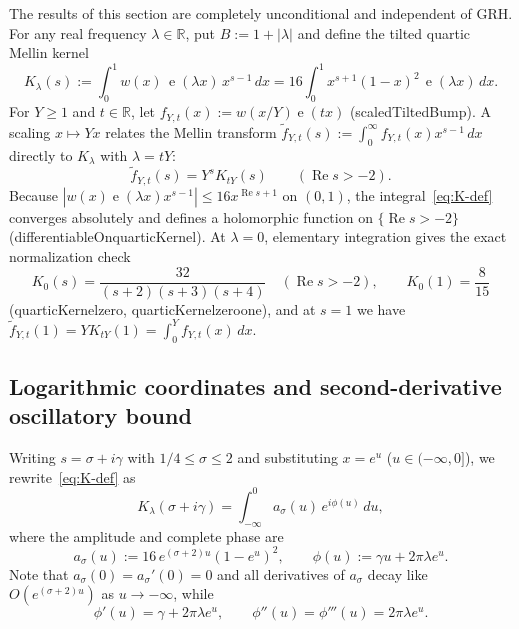 \documentclass[11pt,reqno]{amsart}
\numberwithin{equation}{section}
\theoremstyle{definition}
\newcommand{\R}{\mathbb{R}}
\newcommand{\1}{\mathbf{1}}
\newcommand{\e}{\operatorname{e}}
\renewcommand{\Re}{\operatorname{Re}}
\newcommand{\lean}[1]{{\footnotesize\ttfamily\renewcommand{\_}{\textunderscore\allowbreak}#1}}
\newcommand{\GRH}{\textup{GRH}}
\begin{document}
The results of this section are completely unconditional and independent of \GRH{}. For any real frequency $\lambda \in \R$, put $B := 1 + |\lambda|$ and define the tilted quartic Mellin kernel
\begin{equation}\label{eq:K-def}
  K_\lambda(s) := \int_0^1 w(x)\, \e(\lambda x)\, x^{s-1}\,dx = 16 \int_0^1 x^{s+1}(1-x)^2\, \e(\lambda x)\,dx.
\end{equation}
For $Y \ge 1$ and $t \in \R$, let $f_{Y,t}(x) := w(x/Y)\e(t x)$ (\lean{scaledTiltedBump}). A scaling $x \mapsto Y x$ relates the Mellin transform $\widetilde{f}_{Y,t}(s) := \int_0^\infty f_{Y,t}(x) x^{s-1}\,dx$ directly to $K_\lambda$ with $\lambda = t Y$:
\begin{equation}\label{eq:mellin-scaling}
  \widetilde{f}_{Y,t}(s) = Y^s K_{tY}(s) \qquad (\Re s > -2).
\end{equation}
Because $|w(x)\e(\lambda x)x^{s-1}| \le 16 x^{\Re s + 1}$ on $(0, 1)$, the integral~\eqref{eq:K-def} converges absolutely and defines a holomorphic function on $\{\Re s > -2\}$ (\lean{differentiableOn\_quarticKernel}). At $\lambda = 0$, elementary integration gives the exact normalization check
\begin{equation}\label{eq:K0-exact}
  K_0(s) = \frac{32}{(s+2)(s+3)(s+4)} \quad (\Re s > -2), \qquad K_0(1) = \frac{8}{15}
\end{equation}
(\lean{quarticKernel\_zero}, \lean{quarticKernel\_zero\_one}), and at $s = 1$ we have $\widetilde{f}_{Y,t}(1) = Y K_{tY}(1) = \int_0^Y f_{Y,t}(x)\,dx$.

\subsection{Logarithmic coordinates and second-derivative oscillatory bound}

Writing $s = \sigma + i\gamma$ with $1/4 \le \sigma \le 2$ and substituting $x = e^u$ ($u \in (-\infty, 0]$), we rewrite~\eqref{eq:K-def} as
\begin{equation}\label{eq:K-log-coords}
  K_\lambda(\sigma + i\gamma) = \int_{-\infty}^0 a_\sigma(u)\, e^{i\phi(u)}\,du,
\end{equation}
where the amplitude and complete phase are
\begin{equation}\label{eq:amp-phase}
  a_\sigma(u) := 16\, e^{(\sigma+2)u}(1 - e^u)^2, \qquad \phi(u) := \gamma u + 2\pi \lambda e^u.
\end{equation}
Note that $a_\sigma(0) = a_\sigma'(0) = 0$ and all derivatives of $a_\sigma$ decay like $O(e^{(\sigma+2)u})$ as $u \to -\infty$, while
\begin{equation}\label{eq:phase-derivs}
  \phi'(u) = \gamma + 2\pi\lambda e^u, \qquad \phi''(u) = \phi'''(u) = 2\pi\lambda e^u.
\end{equation}
\end{document}
